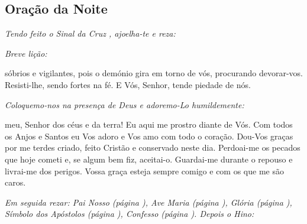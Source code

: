\subsection{Oração da Noite}\label{oracaonoite}

\emph{Tendo feito o Sinal da Cruz \cruz, ajoelha-te e reza:}

\begin{paracol}{2}\switchcolumn{}\switchcolumn*{}\switchcolumn{}\switchcolumn*{}\switchcolumn{}\switchcolumn*{}\switchcolumn{}\switchcolumn*{}\switchcolumn{}\switchcolumn*{}\switchcolumn{}\end{paracol}


\emph{Breve lição:}\par

 sóbrios e vigilantes, pois o demónio gira em torno de vós, procurando devorar-vos. Resisti-lhe, sendo fortes na fé. E Vós, Senhor, tende piedade de nós.\par

\emph{Coloquemo-nos na presença de Deus e adoremo-Lo humildemente:}\par

 meu, Senhor dos céus e da terra! Eu aqui me prostro diante de Vós. Com todos os Anjos e Santos eu Vos adoro e Vos amo com todo o coração. Dou-Vos graças por me terdes criado, feito Cristão e conservado neste dia. Perdoai-me os pecados que hoje cometi e, se algum bem fiz, aceitai-o. Guardai-me durante o repouso e livrai-me dos perigos. Vossa graça esteja sempre comigo e com os que me são caros.\par

\emph{Em seguida rezar: Pai Nosso (página \pageref{painosso}), Ave Maria (página \pageref{avemaria}), Glória (página \pageref{gloria}), Símbolo dos Apóstolos (página \pageref{simboloapostolos}),
Confesso (página \pageref{confesso}). Depois o Hino:}

